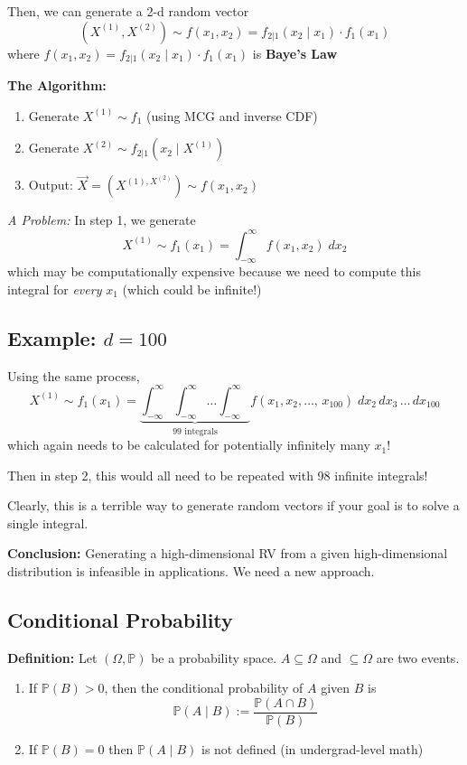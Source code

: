 \documentclass[12pt]{article}
\renewcommand{\P}{\mathbb{P}}
\begin{document}
Then, we can generate a 2-d random vector 
\[(X^{(1)}, X^{(2)}) \sim f(x_1, x_2) = f_{2|1}(x_2 \; | \;x_1) \cdot f_1(x_1)\]
where $f(x_1, x_2) = f_{2 |1}(x_2 \; | \;x_1) \cdot f_1(x_1)$ is \textbf{Baye's Law}

\textbf{The Algorithm:}
\begin{enumerate}
    \item Generate $X^{(1)} \sim f_1$ (using MCG and inverse CDF)
    \item Generate $X^{(2)} \sim f_{2 | 1}(x_2 \; | \; X^{(1)})$
    \item Output: $\vec X = (X^{(1), X^{(2)}}) \sim f(x_1, x_2)$
\end{enumerate}

\emph{A Problem:} In step 1, we generate 
\[X^{(1)} \sim f_1(x_1) = \int_{-\infty}^{\infty} f(x_1, x_2)\; dx_2\]
which may be computationally expensive because we need to compute this integral for \emph{every} $x_1$ (which could be infinite!)

\subsection{Example: $d = 100$}
Using the same process, 
\[X^{(1)} \sim f_1(x_1) = \underbrace{\int_{-\infty}^{\infty} \int_{-\infty}^{\infty} \dots \int_{-\infty}^{\infty}}_{\text{99 integrals}} f(x_1, x_2, \dots,\, x_{100})\; dx_2\, dx_3\, \dots\, dx_{100}\]
which again needs to be calculated for potentially infinitely many $x_1$!

Then in step 2, this would all need to be repeated with 98 infinite integrals!

Clearly, this is a terrible way to generate random vectors if your goal is to solve a single integral.

\textbf{Conclusion:} Generating a high-dimensional RV from a given high-dimensional distribution is infeasible in applications. We need a new approach. 

\subsection{Conditional Probability}
\textbf{Definition:} Let $(\Omega, \P)$ be a probability space. $A \subseteq \Omega$ and $\subseteq \Omega$ are two events.
\begin{enumerate}
    \item If $\P(B) > 0$, then the conditional probability of $A$ given $B$ is 
    \[\P(A \; | \; B) := \frac{\P(A \cap B)}{\P(B)}\]
    \item If $\P(B) = 0$ then $\P(A \; | \; B)$ is not defined (in undergrad-level math)
\end{enumerate}
\end{document}
